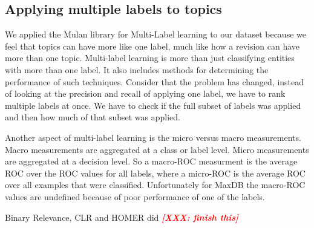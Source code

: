 \documentclass{acm_proc_article-sp}
\newcommand{\XXX}[1]{\textcolor{red}{{\it \textbf{[XXX: #1]}}}}
\begin{document}
\subsection{Applying multiple labels to topics}

We applied the Mulan library for Multi-Label learning to our dataset because we feel that topics can have more like one label, much like how a revision can have more than one topic. Multi-label learning is more than just classifying entities with more than one label. It also includes methods for determining the performance of such techniques. Consider that the problem has changed, instead of looking at the precision and recall of applying one label, we have to rank multiple labels at once. We have to check if the full subset of labels was applied and then how much of that subset was applied.

Another aspect of multi-label learning is the micro versus macro measurements. Macro measurements are aggregated at a class or label level. Micro measurements are aggregated at a decision level. So a macro-ROC measurment is the average ROC over the ROC values for all labels, where a micro-ROC is the average ROC over all examples that were classified. Unfortunately for MaxDB the macro-ROC values are undefined because of poor performance of one of the labels.

Binary Relevance, CLR and HOMER did \XXX{finish this}
\end{document}
